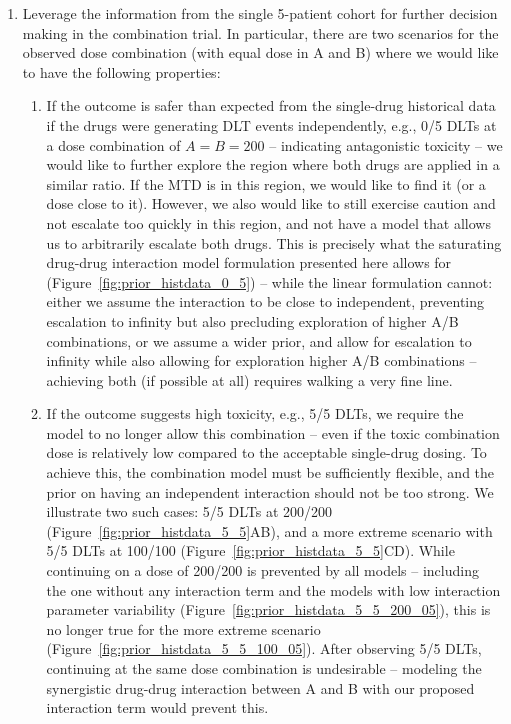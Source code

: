 \documentclass[AMA,STIX1COL]{WileyNJD-v2}
\begin{document}
\begin{enumerate}
\item Leverage the information from the single 5-patient cohort for further decision making in the combination trial. In particular, there are two scenarios for the observed dose combination (with equal dose in A and B) where we would like to have the following properties:
\begin{enumerate}
\item If the outcome is safer than expected from the single-drug historical data if the drugs were generating DLT events independently, e.g., 0/5 DLTs at a dose combination of $A = B = 200$ -- indicating antagonistic toxicity -- we would like to further explore the region where both drugs are applied in a similar ratio. If the MTD is in this region, we would like to find it (or a dose close to it). However, we also would like to still exercise caution and not escalate too quickly in this region, and not have a model that allows us to arbitrarily escalate both drugs. This is precisely what the saturating drug-drug interaction model formulation presented here allows for (Figure~\ref{fig:prior_histdata_0_5}) -- while the linear formulation cannot: either we assume the interaction to be close to independent, preventing escalation to infinity but also precluding exploration of higher A/B combinations, or we assume a wider prior, and allow for escalation to infinity while also allowing for exploration higher A/B combinations -- achieving both (if possible at all) requires walking a very fine line.
\item If the outcome suggests high toxicity, e.g., 5/5 DLTs, we require the model to no longer allow this combination -- even if the toxic combination dose is relatively low compared to the acceptable single-drug dosing. To achieve this, the combination model must be sufficiently flexible, and the prior on having an independent interaction should not be too strong. We illustrate two such cases: 5/5 DLTs at 200/200 (Figure~\ref{fig:prior_histdata_5_5}AB), and a more extreme scenario with 5/5 DLTs at 100/100 (Figure~\ref{fig:prior_histdata_5_5}CD). While continuing on a dose of 200/200 is prevented by all models -- including the one without any interaction term and the models with low interaction parameter variability (Figure~\ref{fig:prior_histdata_5_5_200_05}), this is no longer true for the more extreme scenario (Figure~\ref{fig:prior_histdata_5_5_100_05}). After observing 5/5 DLTs, continuing at the same dose combination is undesirable -- modeling the synergistic drug-drug interaction between A and B with our proposed interaction term would prevent this.



\end{enumerate}
\end{enumerate}
\end{document}
